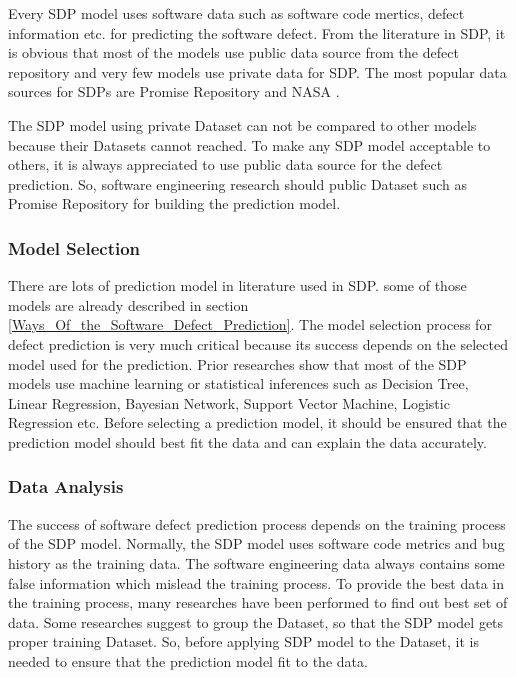 \documentclass[12pt]{report}
\begin{document}
Every SDP model uses software data such as software code mertics, defect information etc. for predicting the software defect. From the literature in SDP, it is obvious that most of the models use public data source from the defect repository and very few models use private data for SDP. The most popular data sources for SDPs are Promise Repository \cite{promise12} and NASA \cite{nasa2007respository}. 

The SDP model using private Dataset can not be compared to other models because their Datasets cannot reached. 
To make any SDP model acceptable to others, it is always appreciated to use public data source for the defect prediction. So, software engineering research should public Dataset such as Promise Repository \cite{promise12} for building the prediction model.


%


\subsubsection{Model Selection}
There are lots of prediction model in literature used in SDP. some of those models are already described in section \ref{Ways_Of_the_Software_Defect_Prediction}. The model selection process for defect prediction is very much critical because its success depends on the selected model used for the prediction. Prior researches show that most of the SDP models use machine learning or statistical inferences such as Decision Tree, Linear Regression, Bayesian Network, Support Vector Machine, Logistic Regression etc. Before selecting a prediction model, it should be ensured that the prediction model should best fit the data and can explain the data accurately. 

\subsubsection{Data Analysis}
The success of software defect prediction process depends on the training process of the SDP model. Normally, the SDP model uses software code metrics and bug history as the training data. The software engineering data always contains some false information which mislead the training process. To provide the best data in the training process, many researches have been performed to find out best set of data. Some researches suggest to group the Dataset, so that the SDP model gets proper training Dataset. So, before applying SDP model to the Dataset, it is needed to ensure that the prediction model fit to the data.     
\end{document}
